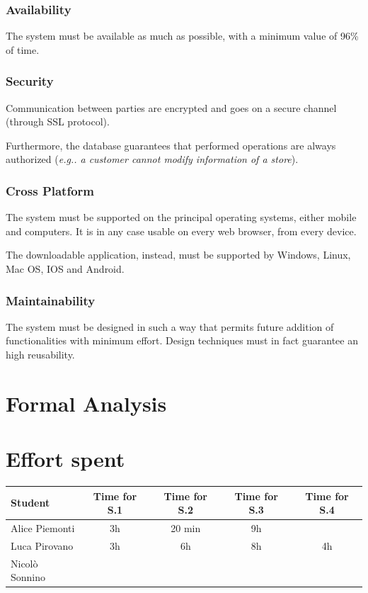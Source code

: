 \documentclass[table, 12pt]{article}
\begin{document}
\subsubsection{Availability}
The system must be available as much as possible, with a minimum value of 96\% of time.
\subsubsection{Security}
Communication between parties are encrypted and goes on a secure channel (through SSL protocol).

Furthermore, the database guarantees that performed operations are always authorized (\textit{e.g.. a customer cannot modify information of a store}).
\subsubsection{Cross Platform}
The system must be supported on the principal operating systems, either mobile and computers. It is in any case usable on every web browser, from every device.

The downloadable application, instead, must be supported by Windows, Linux, Mac OS, IOS and Android.
\subsubsection{Maintainability}
The system must be designed in such a way that permits future addition of functionalities with minimum effort.
Design techniques must in fact guarantee an high reusability.
\newpage
\section{Formal Analysis}
\newpage
\section{Effort spent}
\begin{tabular}{ | l || c | c | c | c |}
    \hline
    Student        & Time for S.1 & Time for S.2 & Time for S.3 & Time for S.4 \\ \hline
    Alice Piemonti & 3h           & 20 min       & 9h           &              \\ \hline
    Luca Pirovano  & 3h           & 6h           & 8h           & 4h           \\ \hline
    Nicolò Sonnino &              &              &              &              \\
    \hline
\end{tabular}
\end{document}
